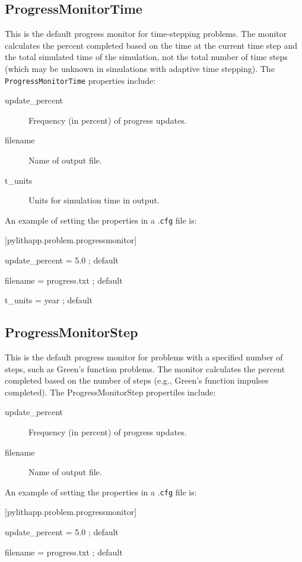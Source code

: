 \subsection{ProgressMonitorTime}

This is the default progress monitor for time-stepping problems. The
monitor calculates the percent completed based on the time at the
current time step and the total simulated time of the simulation,
not the total number of time steps (which may be unknown in simulations
with adaptive time stepping). The \texttt{ProgressMonitorTime} properties
include:
\begin{description}
\item [{update\_percent}] Frequency (in percent) of progress updates.
\item [{filename}] Name of output file.
\item [{t\_units}] Units for simulation time in output.
\end{description}
An example of setting the properties in a .\texttt{cfg} file is:
\begin{lyxcode}
{[}pylithapp.problem.progressmonitor{]}

update\_percent = 5.0 ; default

filename = progress.txt ; default

t\_units = year ; default
\end{lyxcode}

\subsection{ProgressMonitorStep}

This is the default progress monitor for problems with a specified
number of steps, such as Green's function problems. The monitor calculates
the percent completed based on the number of steps (e.g., Green's
function impulses completed). The ProgressMonitorStep propertiles
include:
\begin{description}
\item [{update\_percent}] Frequency (in percent) of progress updates.
\item [{filename}] Name of output file.
\end{description}
An example of setting the properties in a .\texttt{cfg} file is:
\begin{lyxcode}
{[}pylithapp.problem.progressmonitor{]}

update\_percent = 5.0 ; default

filename = progress.txt ; default
\end{lyxcode}

